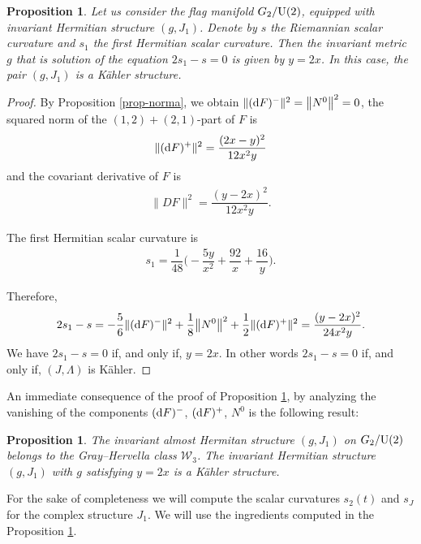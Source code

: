 \documentclass[pdftex]{sigma}%
\numberwithin{equation}{section}
\newtheorem{Proposition}[Theorem]{Proposition}
 { \theoremstyle{definition}
\newtheorem{Definition}[Theorem]{Definition}
\newtheorem{Question}[Theorem]{Question}
\newtheorem*{Notation}{Notation}
\newtheorem{Example}[Theorem]{Example}
\newtheorem{Remark}[Theorem]{Remark} }
\begin{document}
\begin{Proposition} \label{prop-g2-j1}
Let us consider the flag manifold $G_{2}/{\rm U}(2)$, equipped with invariant Hermitian structure $(g, J_{1})$. Denote by $s$ the Riemannian scalar curvature and $s_1$ the first Hermitian scalar curvature. Then the invariant metric $g$ that is solution of the equation $2s_1-s=0$ is given by $y=2x$. In this case, the pair $(g, J_{1})$ is a K\"ahler structure.
\end{Proposition}
\begin{proof}
By Proposition \ref{prop-norma}, we obtain $\|({\rm d}F)^{-}\|^{2}=\big\|N^{0}\big\|^{2}=0$, the squared norm of the $(1,2)+(2,1)$-part of $F$ is
\begin{gather*}
\|({\rm d}F)^{+}\|^{2}=\dfrac{(2 x-y)^2}{12 x^2 y}
\end{gather*}
and the covariant derivative of $F$ is
\begin{gather*}
\|DF\|^{2}=\dfrac{(y-2 x)^2}{12 x^2 y}.
\end{gather*}

The first Hermitian scalar curvature is
\begin{gather*}
s_{1}=\dfrac{1}{48} \bigg({-}\dfrac{5 y}{x^2}+\dfrac{92}{x}+\dfrac{16}{y}\bigg).
\end{gather*}

Therefore,
\begin{align*}
2s_{1}-s=-\dfrac{5}{6}\|({\rm d}F)^{-}\|^{2}+\dfrac{1}{8}\big\|N^{0}\big\|^{2}+\dfrac{1}{2}\|({\rm d}F)^{+}\|^{2}
=\dfrac{(y-2 x)^2}{24 x^2 y}.
\end{align*}
We have $2s_{1}-s=0$ if, and only if, $y=2x$. In other words $2s_{1}-s=0$ if, and only if, $(J,\Lambda)$ is K\"ahler.
\end{proof}

An immediate consequence of the proof of Proposition \ref{prop-g2-j1}, by analyzing the vanishing of the components $({\rm d}F)^{-}$, $({\rm d}F)^{+}$, $N^0$ is the following result:
\begin{Proposition}
The invariant almost Hermitan structure $(g, J_{1})$ on $G_{2}/{\rm U}(2)$ belongs to the Gray--Hervella class $\mathcal{W}_{3}$. The invariant Hermitian structure $(g, J_{1})$ with $g$ satisfying $y=2x$ is a K\"ahler structure.
\end{Proposition}


For the sake of completeness we will compute the scalar curvatures $s_2(t)$ and $s_J$ for the complex structure $J_1$. We will use the ingredients computed in the Proposition \ref{prop-g2-j1}.
\end{document}
